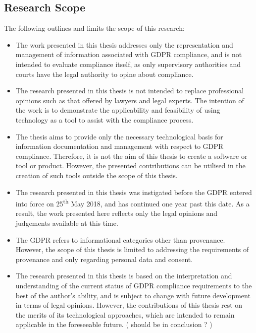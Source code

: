 \subsection{Research Scope}\label{sec:intro-scope}
The following outlines and limits the scope of this research:
\begin{itemize}
    \item The work presented in this thesis addresses only the representation and management of information associated with GDPR compliance, and is not intended to evaluate compliance itself, as only supervisory authorities and courts have the legal authority to opine about compliance.
    \item The research presented in this thesis is not intended to replace professional opinions such as that offered by lawyers and legal experts. The intention of the work is to demonstrate the applicability and feasibility of using technology as a tool to assist with the compliance process.
    \item The thesis aims to provide only the necessary technological basis for information documentation and management with respect to GDPR compliance. Therefore, it is not the aim of this thesis to create a software or tool or product. However, the presented contributions can be utilised in the creation of such tools outside the scope of this thesis.
    \item The research presented in this thesis was instigated before the GDPR entered into force on 25\textsuperscript{th} May 2018, and has continued one year past this date. As a result, the work presented here reflects only the legal opinions and judgements available at this time.
    \item The GDPR refers to informational categories other than provenance. However, the scope of this thesis is limited to addressing the requirements of provenance and only regarding personal data and consent.
    \item The research presented in this thesis is based on the interpretation and understanding of the current status of GDPR compliance requirements to the best of the author's ability, and is subject to change with future development in terms of legal opinions. However, the contributions of this thesis rest on the merits of its technological approaches, which are intended to remain applicable in the foreseeable future. ( should be in conclusion ? )
\end{itemize}

